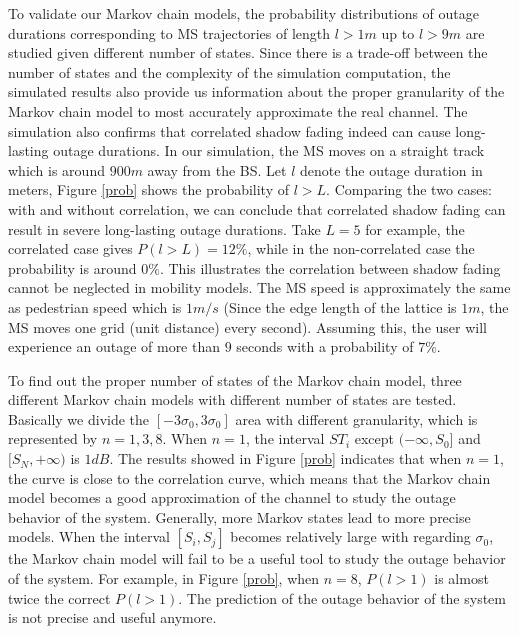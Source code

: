 \par To validate our Markov chain models, the probability distributions of outage durations corresponding to MS trajectories of length $l>1m$ up to $l>9m$ are studied given different number of states. Since there is a trade-off between the number of states and the complexity of the simulation computation, the simulated results also provide us information about the proper granularity of the Markov chain model to most accurately approximate the real channel. The simulation also confirms that correlated shadow fading indeed can cause long-lasting outage durations. In our simulation, the MS moves on a straight track which is around $900m$ away from the BS. Let $l$ denote the outage duration in meters, Figure \ref{prob} shows the probability of $l>L$. Comparing the two cases: with and without correlation, we can conclude that correlated shadow fading can result in severe long-lasting outage durations. Take $L=5$ for example, the correlated case gives $P(l>L)=12\%$, while in the non-correlated case the probability is around $0\%$. This illustrates the correlation between shadow fading cannot be neglected in mobility models. The MS speed is approximately the same as pedestrian speed which is $1m/s$ (Since the edge length of the lattice is $1m$, the MS moves one grid (unit distance) every second). Assuming this, the user will experience an outage of more than $9$ seconds with a probability of $7\%$.
\par To find out the proper number of states of the Markov chain model, three different Markov chain models with different number of states are tested. Basically we divide the $[-3\sigma_{0},3\sigma_{0}]$ area with different granularity, which is represented by $n=1,3,8$. When $n=1$, the interval $ST_{i}$ except $(-\infty,S_{0}]$ and $[S_{N},+\infty)$ is $1dB$. The results showed in Figure \ref{prob} indicates that when $n=1$, the curve is close to the correlation curve, which means that the Markov chain model becomes a good approximation of the channel to study the outage behavior of the system. Generally, more Markov states lead to more precise models. When the interval $[S_{i},S_{j}]$ becomes relatively large with regarding $\sigma_{0}$, the Markov chain model will fail to be a useful tool to study the outage behavior of the system. For example, in Figure \ref{prob}, when $n=8$, $P(l>1)$ is almost twice the correct $P(l>1)$. The prediction of the outage behavior of the system is not precise and useful anymore.
